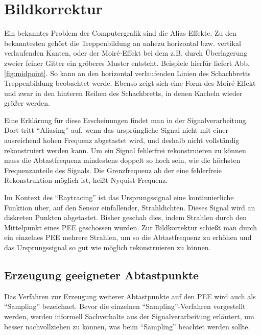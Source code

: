 
\chapter{Bildkorrektur}

Ein bekanntes Problem der Computergrafik sind die Alias-Effekte. Zu den bekanntesten gehört die Treppenbildung an nahezu horizontal bzw. vertikal verlaufenden Kanten, oder der Moiré-Effekt bei dem z.B. durch Überlagerung zweier feiner Gitter ein gröberes Muster entsteht.
Beispiele hierfür liefert Abb. \ref{fig:midpoint}. So kann an den horizontal verlaufenden Linien des Schachbretts Treppenbildung beobachtet werde. Ebenso zeigt sich eine Form des Moiré-Effekt und zwar in den hinteren Reihen des Schachbretts, in denen Kacheln wieder größer werden.

Eine Erklärung für diese Erscheinungen findet man in der Signalverarbeitung. Dort tritt "`Aliasing"' auf, wenn das ursprüngliche Signal nicht mit einer ausreichend hohen Frequenz abgetastet wird, und deshalb nicht vollständig rekonstruiert werden kann. Um ein Signal fehlerfrei rekonstruieren zu können muss die Abtastfrequenz mindestens doppelt so hoch sein, wie die höchsten Frequenzanteile des Signals. Die Grenzfrequenz ab der eine fehlerfreie Rekonstruktion möglich ist, heißt Nyquist-Frequenz.

Im Kontext des "`Raytracing"' ist das Ursprungssignal eine kontinuierliche Funktion über,  auf den Sensor einfallender, Strahldichten. Dieses Signal wird an diskreten Punkten abgetastet. Bisher geschah dies, indem Strahlen durch den Mittelpunkt eines PEE geschossen wurden.
Zur Bildkorrektur schießt man durch ein einzelnes PEE mehrere Strahlen, um so die Abtastfrequenz zu erhöhen und das Ursprungssignal so gut wie möglich rekonstruieren zu können.



\section{Erzeugung geeigneter Abtastpunkte}

Das Verfahren zur Erzeugung weiterer Abtastpunkte auf den PEE wird auch als "`Sampling"' bezeichnet. Bevor die einzelnen "`Sampling"'-Verfahren vorgestellt werden, werden informell Sachverhalte aus der Signalverarbeitung erläutert, um besser nachvollziehen zu können, was beim "`Sampling"' beachtet werden sollte.

